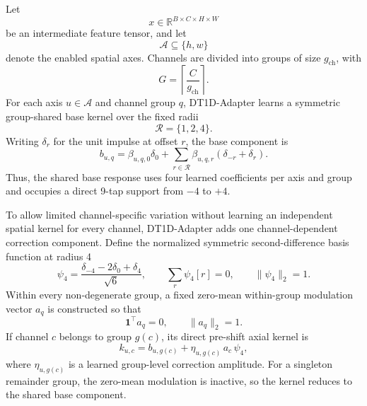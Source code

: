 \documentclass[pdflatex,sn-mathphys-num]{sn-jnl}
\theoremstyle{thmstyleone}
\theoremstyle{thmstyletwo}
\theoremstyle{thmstylethree}
\begin{document}
Let
\begin{equation}
x\in\mathbb{R}^{B\times C\times H\times W}
\end{equation}
be an intermediate feature tensor, and let
\begin{equation}
\mathcal{A}\subseteq\{h,w\}
\end{equation}
denote the enabled spatial axes. Channels are divided into groups of size $g_{\mathrm{ch}}$, with
\begin{equation}
G=\left\lceil \frac{C}{g_{\mathrm{ch}}}\right\rceil .
\end{equation}
For each axis $u\in\mathcal{A}$ and channel group $q$, DT1D-Adapter learns a symmetric group-shared base kernel over the fixed radii
\begin{equation}
\mathcal{R}=\{1,2,4\}.
\end{equation}
Writing $\delta_r$ for the unit impulse at offset $r$, the base component is
\begin{equation}
b_{u,q}
=
\beta_{u,q,0}\delta_0
+
\sum_{r\in\mathcal{R}}
\beta_{u,q,r}\left(\delta_{-r}+\delta_r\right).
\label{eq:dt1d_shared_base}
\end{equation}
Thus, the shared base response uses four learned coefficients per axis and group and occupies a direct 9-tap support from $-4$ to $+4$.

To allow limited channel-specific variation without learning an independent spatial kernel for every channel, DT1D-Adapter adds one channel-dependent correction component. Define the normalized symmetric second-difference basis function at radius 4
\begin{equation}
\psi_4
=
\frac{\delta_{-4}-2\delta_0+\delta_4}{\sqrt{6}},
\qquad
\sum_r \psi_4[r]=0,
\qquad
\|\psi_4\|_2=1.
\label{eq:dt1d_radius4_basis}
\end{equation}
Within every non-degenerate group, a fixed zero-mean within-group modulation vector $a_q$ is constructed so that
\begin{equation}
\mathbf{1}^{\top}a_q=0,
\qquad
\|a_q\|_2=1.
\label{eq:dt1d_channel_modulation}
\end{equation}
If channel $c$ belongs to group $g(c)$, its direct pre-shift axial kernel is
\begin{equation}
k_{u,c}
=
b_{u,g(c)}
+
\eta_{u,g(c)}\,a_c\,\psi_4,
\label{eq:dt1d_kernel}
\end{equation}
where $\eta_{u,g(c)}$ is a learned group-level correction amplitude. For a singleton remainder group, the zero-mean modulation is inactive, so the kernel reduces to the shared base component.
\end{document}
